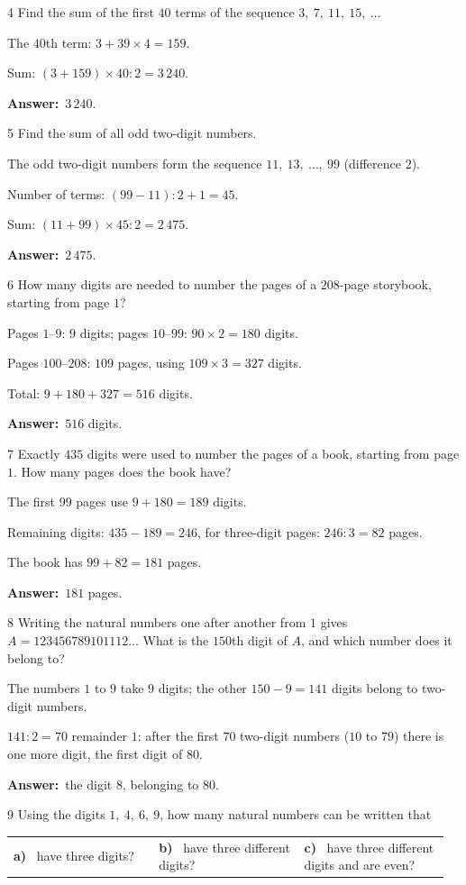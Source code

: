 \documentclass[11pt]{article}
\makeatletter
\newif\ifsol \solfalse
\renewcommand{\arraystretch}{1.35}
\providecommand{\AnsWord}{Đáp số}
\newcommand{\dapso}[1]{\par\textbf{\AnsWord:}\ #1}
\newcommand{\probsol}[1]{%
  \begin{lrbox}{\solmeasure}\begin{minipage}{\dimexpr\linewidth-24pt\relax}#1\end{minipage}\end{lrbox}%
  \ifsol
    \begin{solbox}#1\end{solbox}%
  \else
    \setlength{\solht}{\dimexpr\ht\solmeasure+\dp\solmeasure+0.85cm\relax}%
    \ifdim\solht<1.35cm\setlength{\solht}{1.35cm}\fi
    \begin{tcolorbox}[colback=white,colframe=Line,boxrule=0.8pt,arc=5pt,
      left=8pt,right=8pt,top=4pt,bottom=4pt,height=\solht]{\footnotesize\color{Slate}\itshape\WorkWord}\end{tcolorbox}%
  \fi}
\newcommand{\pa}[1]{\textbf{#1)}\ }
\newenvironment{cols3}{\par\vspace{3pt}\noindent\setlength{\tabcolsep}{0pt}\renewcommand{\arraystretch}{1.3}%
  \begin{tabular}{@{}>{\raggedright\arraybackslash\rule{0pt}{4.4ex}}p{0.32\linewidth}<{\rule[-2.3ex]{0pt}{0pt}}@{\hspace{0.015\linewidth}}>{\raggedright\arraybackslash\rule{0pt}{4.4ex}}p{0.32\linewidth}<{\rule[-2.3ex]{0pt}{0pt}}@{\hspace{0.015\linewidth}}>{\raggedright\arraybackslash\rule{0pt}{4.4ex}}p{0.32\linewidth}<{\rule[-2.3ex]{0pt}{0pt}}@{}}}%
  {\end{tabular}\par}
\newcommand{\gap}{\vspace{0.3cm}}
\def\WorkWord{Your work:}
\def\AnsWord{Answer}
\makeatother
\begin{document}
\gap
\begin{probbox}{4}{\relax}
Find the sum of the first $40$ terms of the sequence $3,\ 7,\ 11,\ 15,\ \dots$
\end{probbox}
\probsol{
The $40$th term: $3+39\times4=159$.\par Sum: $(3+159)\times40:2=3\,240$.
\dapso{$3\,240$.}}
\gap
\begin{probbox}{5}{\relax}
Find the sum of all odd two-digit numbers.
\end{probbox}
\probsol{
The odd two-digit numbers form the sequence $11,\ 13,\ \dots,\ 99$ (difference $2$).\par
Number of terms: $(99-11):2+1=45$.\par Sum: $(11+99)\times45:2=2\,475$.
\dapso{$2\,475$.}}
\gap
\begin{probbox}{6}{\relax}
How many digits are needed to number the pages of a $208$-page storybook, starting from page $1$?
\end{probbox}
\probsol{
Pages $1$--$9$: $9$ digits; pages $10$--$99$: $90\times2=180$ digits.\par
Pages $100$--$208$: $109$ pages, using $109\times3=327$ digits.\par
Total: $9+180+327=516$ digits.
\dapso{$516$ digits.}}
\gap
\begin{probbox}{7}{\relax}
Exactly $435$ digits were used to number the pages of a book, starting from page $1$. How many pages does the book have?
\end{probbox}
\probsol{
The first $99$ pages use $9+180=189$ digits.\par
Remaining digits: $435-189=246$, for three-digit pages: $246:3=82$ pages.\par
The book has $99+82=181$ pages.
\dapso{$181$ pages.}}
\gap
\begin{probbox}{8}{\relax}
Writing the natural numbers one after another from $1$ gives $A=123456789101112\dots$ What is the $150$th digit of $A$, and which number does it belong to?
\end{probbox}
\probsol{
The numbers $1$ to $9$ take $9$ digits; the other $150-9=141$ digits belong to two-digit numbers.\par
$141:2=70$ remainder $1$: after the first $70$ two-digit numbers ($10$ to $79$) there is one more digit, the first digit of $80$.
\dapso{the digit $8$, belonging to $80$.}}
\gap
\begin{probbox}{9}{\relax}
Using the digits $1,\ 4,\ 6,\ 9$, how many natural numbers can be written that
\begin{cols3}
\pa{a} have three digits? & \pa{b} have three different digits? & \pa{c} have three different digits and are even?
\end{cols3}
\end{probbox}
\end{document}
